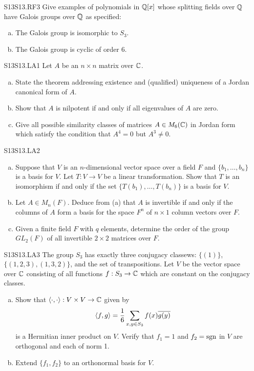 \documentclass[../AlgebraQualSolutions.tex]{subfiles}
\begin{document}
\begin{prob}{S13}{S13.RF3}
Give examples of polynomials in $\mathbb{Q}[x]$ whose splitting fields over $\mathbb{Q}$ have Galois groups over $\mathbb{Q}$ as specified:
	\begin{enumerate}[(a)]
		\item The Galois group is isomorphic to $S_3$.
		\item The Galois group is cyclic of order 6.
	\end{enumerate}
\end{prob}

\begin{prob}{S13}{S13.LA1}
Let $A$ be an $n \times n$ matrix over $\mathbb{C}$.
	\begin{enumerate}[(a)]
		\item State the theorem addressing existence and (qualified) uniqueness of a Jordan canonical form of $A$.
		\item Show that $A$ is nilpotent if and only if all eigenvalues of $A$ are zero.
		\item Give all possible similarity classes of matrices $A \in M_6(\mathbb{C})$ in Jordan form which satisfy the condition that  $A^4 = 0$ but $A^3 \neq 0$.
	\end{enumerate}
\end{prob}

\begin{prob}{S13}{S13.LA2}

	\begin{enumerate}[(a)]
		\item Suppose that $V$ is an $n$-dimensional vector space over a field $F$ and $\{b_1, \ldots, b_n\}$ is a basis for $V$. Let $T: V \to V$ be a linear transformation. Show that $T$ is an isomorphism if and only if the set $\{T(b_1), \ldots, T(b_n)\}$ is a basis for $V$.
		\item Let $A \in M_n(F)$. Deduce from (a) that $A$ is invertible if and only if the columns of $A$ form a basis for the space $F^n$  of $n \times 1$ column vectors over $F$.
		\item Given a finite field $F$ with $q$ elements, determine the order of the group $GL_2(F)$ of all invertible $2 \times 2$ matrices over $F$.
	\end{enumerate}
\end{prob}

\begin{prob}{S13}{S13.LA3}
The group $S_3$ has exactly three conjugacy classews: $\{(1)\}$, $\{(1,2,3), (1,3,2)\}$, and the set of transpositions. Let $V$ be the vector space over $\mathbb{C}$ consisting of all functions $f:S_3 \to \mathbb{C}$ which are constant on the conjugacy classes.
	\begin{enumerate}[(a)]
		\item Show that $\langle \cdot, \cdot\rangle: V \times V \to \mathbb{C}$ given by 
			\[\langle f, g\rangle = \frac{1}{6} \sum_{x,y \in S_3} f(x) \overline{g(y)}\]
		is a Hermitian inner product on $V$. Verify that $f_1 = 1$ and $f_2 = \rm{sgn}$ in $V$ are orthogonal and each of norm 1. 
	\item Extend $\{f_1, f_2\}$ to an orthonormal basis for $V$.
	\end{enumerate}
\end{prob}
\end{document}
